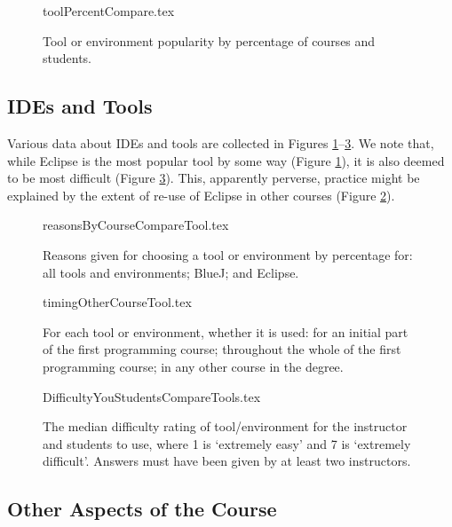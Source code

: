\documentclass{sig-alternate}
\begin{document}
\begin{figure}
\begin{center}
{toolPercentCompare.tex}
\caption{Tool or environment popularity by percentage of courses and students.\label{fig:tools}}
\end{center}
\end{figure}

\subsection{IDEs and Tools}

Various data about IDEs and tools are collected in Figures
\ref{fig:tools}--\ref{fig:toolhard}. We note that, while Eclipse is
the most popular tool by some way (Figure \ref{fig:tools}), it is also
deemed to be most difficult (Figure \ref{fig:toolhard}). This,
apparently perverse, practice might be explained by the extent of
re-use of Eclipse in other courses (Figure \ref{fig:toolreuse}).

\begin{figure}
\begin{center}
{reasonsByCourseCompareTool.tex}
\end{center}
\caption{Reasons given for choosing a tool or environment by percentage for: all tools and environments; BlueJ; and Eclipse.}
\end{figure}

\begin{figure}
\begin{center}
{timingOtherCourseTool.tex}
\end{center}\vskip-18pt
\caption{For each tool or environment, whether it is used: for an initial part of the first programming course; throughout the whole of the first programming course; in any other course in the degree.\label{fig:toolreuse}}
\end{figure}


\begin{figure}
\begin{center}
{DifficultyYouStudentsCompareTools.tex}
\end{center}
\caption{The median difficulty rating of tool/environment for the instructor and students to use, where 1 is `extremely easy' and 7 is `extremely difficult'.  Answers must have been given by at least two instructors.\label{fig:toolhard}}
\end{figure}

\subsection{Other Aspects of the Course}
\end{document}
